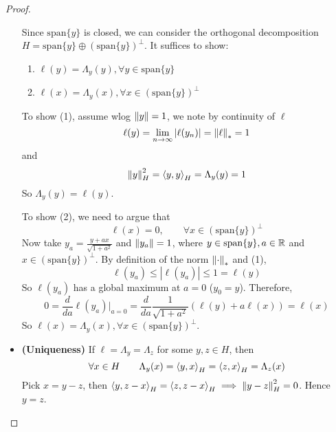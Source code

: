 \documentclass{article}
\begin{document}
\begin{proof}
\begin{itemize}
        Since  \(\textrm{span}\{y\}\) is closed, we can consider the orthogonal decomposition  \(H = \textrm{span}\{y\} \oplus (\textrm{span}\{y\})^{\perp}\).  
        It suffices to show:  
        \begin{enumerate}[(1)]
            \item  \(\ell(y)=\Lambda_y(y), \forall y \in \textrm{span}\{y\}\)
            \item  \(\ell(x)=\Lambda_y(x), \forall x \in (\textrm{span}\{y\})^{\perp}\)
        \end{enumerate}  
        To show (1), assume wlog  \(\left\|{y}\right\|=1\), we note by continuity of  \(\ell\)  
        \begin{equation*}
            \ell(y) = \lim_{n \to \infty} |\ell(y_n)| = \left\|{\ell}\right\|_*=1
        \end{equation*}  
        and 
        \begin{equation*}
            \left\|{y}\right\|^2_H = \left<{y},{y}\right>_H =\Lambda_y(y)=1
        \end{equation*}  
        So  \(\Lambda_y(y)=\ell(y)\).  
        
        To show (2), we need to argue that 
        \begin{equation*}
            \ell(x)=0, \qquad \forall x \in (\textrm{span}\{y\})^{\perp}
        \end{equation*}  
        Now take  \(y_a = \frac{y+ax}{\sqrt{1+a^2}}\) and  \(\left\|{y_a}\right\|=1\), where  \(y \in \textrm{span}\{y\}, a\in \mathbb{R}\) and  \(x \in (\textrm{span}\{y\})^{\perp}\). By definition of the norm  \(\left\|{\cdot}\right\|_*\) and (1),  
        \begin{equation*}
            \ell(y_a)  \leq |\ell(y_a)| \leq 1 = \ell(y)
        \end{equation*}  
        So  \(\ell(y_a)\) has a global maximum at  \(a=0\)  (\(y_0=y\)). Therefore,  
        \begin{equation*}
            0 = \frac{d}{da} \ell(y_a) \Bigr|_{a=0} = \frac{d}{da} \frac{1}{\sqrt{1+a^2}} (\ell(y)+a\ell(x))=\ell(x)
        \end{equation*}  
        So  \(\ell(x)=\Lambda_y(x), \forall x \in (\textrm{span}\{y\})^{\perp}\).
        
        \item \textbf{(Uniqueness)}  
        If  \(\ell=\Lambda_y=\Lambda_z\) for some  \(y,z \in H\), then  
        \[
        \forall x \in H \qquad \Lambda_y(x) = \left<{y},{x}\right>_H = \left<{z},{x}\right>_H = \Lambda_z(x)
        \]  
        Pick  \(x=y-z\), then  \(\left<{y},{z-x}\right>_H = \left<{z},{z-x}\right>_H \implies \left\|{y-z}\right\|_H^2=0\). Hence  \(y=z\).
    \end{itemize}
\end{proof}
\end{document}
